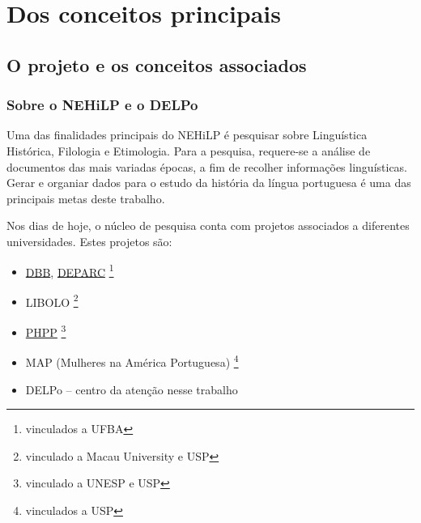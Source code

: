
\chapter{Dos conceitos principais}
\label{cap:main-concepts}
\minitoc


\section{O projeto e os conceitos associados}
\label{sec:project}

\subsection{Sobre o NEHiLP e o DELPo}
\label{subsec:nehilp-delpo}

Uma das finalidades principais do NEHiLP é pesquisar sobre Linguística Histórica,
Filologia e Etimologia. Para a pesquisa, requere-se a análise de documentos das
mais variadas épocas, a fim de recolher informações linguísticas. Gerar e organiar
dados para o estudo da história da língua portuguesa é uma das principais metas
deste trabalho.

Nos dias de hoje, o núcleo de pesquisa conta com projetos associados a diferentes
universidades. Estes projetos são: \begin{itemize}
   \item \href{https://gruponemesis.ufba.br/projetos/dicion\%C3\%A1rio-dialetal-brasileiro}{DBB},
   \href{https://gruponemesis.ufba.br/projetos/dicion\%C3\%A1rio-etimol\%C3\%B3gico-do-portugu\%C3\%AAs-arcaico}{DEPARC}
   \footnote{vinculados a UFBA}
   \item LIBOLO \footnote{vinculado a Macau University e USP}
   \item \href{http://ccint.fflch.usp.br/projeto-de-historia-do-portugues-paulista-phpp-projeto-caipira-2}{PHPP} \footnote{vinculado a UNESP e USP}
   \item MAP (Mulheres na América Portuguesa) \footnote{vinculados a USP}
   \item DELPo -- centro da atenção nesse trabalho
\end{itemize}

